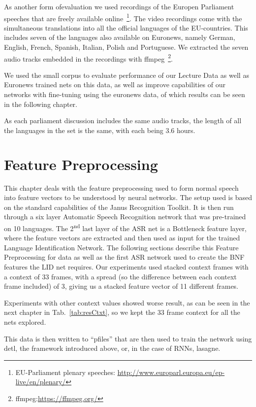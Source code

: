 As another form ofevaluation we used recordings of the Europen Parliament speeches that are freely available online~\footnote{EU-Parliament plenary speeches: \url{http://www.europarl.europa.eu/ep-live/en/plenary/}}. The video recordings come with the simultaneous translations into all the official languages of the EU-countries. This includes seven of the languages also available on Euronews, namely German, English, French, Spanish, Italian, Polish and Portuguese. We extracted the seven audio tracks embedded in the recordings with ffmpeg~\footnote{ffmpeg:\url{https://ffmpeg.org/}}. 

We used the small corpus to evaluate performance of our Lecture Data as well as Euronews trained nets on this data, as well as improve capabilities of our networks with fine-tuning using the euronews data, of which results can be seen in the following chapter.

As each parliament discussion includes the same audio tracks, the length of all the languages in the set is the same, with each being 3.6 hours. 


\section{Feature Preprocessing}
\label{ch:FP}

This chapter deals with the feature preprocessing used to form normal speech into feature vectors to be understood by neural networks. The setup used is based on the standard capabilities of the Janus Recognition Toolkit. It is then run through a six layer Automatic Speech Recognition network that was pre-trained on 10 languages. The 2\textsuperscript{nd} last layer of the ASR net is a Bottleneck feature layer, where the feature vectors are extracted and then used as input for the trained Language Identification Network. The following sections describe this Feature Preprocessing for data as well as the first ASR network used to create the BNF features the LID net requires. Our experiments used stacked context frames with a context of 33 frames, with a spread (so the difference between each context frame included) of 3, giving us a stacked feature vector of 11 different frames.

Experiments with other context values showed worse result, as can be seen in the next chapter in Tab.~\ref{tab:resCtxt}, so we kept the 33 frame context for all the nets explored.

This data is then written to ``pfiles'' that are then used to train the network using detl, the framework introduced above, or, in the case of RNNs, lasagne.

